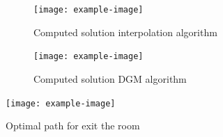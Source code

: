 \begin{figure}[htb!]		
	\begin{subfigure}{.475\linewidth}
		\texttt{[image: example-image]}
		\caption{Computed solution interpolation algorithm}
		\label{fig:Solution_Interp}
	\end{subfigure}\hfill %
	\begin{subfigure}{.475\linewidth}
		\texttt{[image: example-image]}
		\caption{Computed solution DGM algorithm}
		\label{fig:Solution_DGM}
	\end{subfigure}
	\caption{}
	\label{fig:Computed solutions}
\end{figure}

\begin{figure}[H]
	\centering
	\texttt{[image: example-image]}
	\caption{Optimal path for exit the room}
	\label{fig:OptimalPathRoom}
\end{figure}

